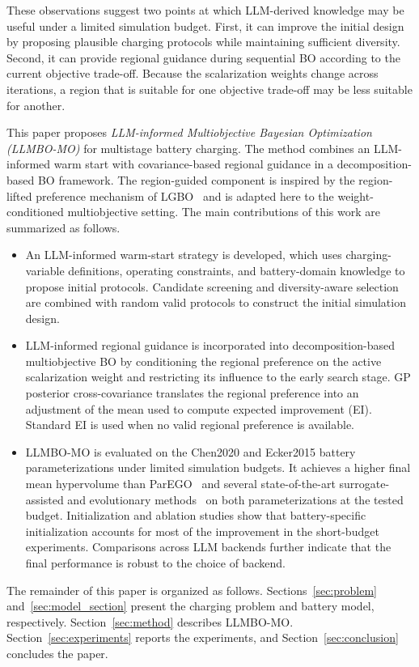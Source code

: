 These observations suggest two points at which LLM-derived knowledge may be
useful under a limited simulation budget. First, it can improve the initial
design by proposing plausible charging protocols while maintaining sufficient
diversity. Second, it can provide regional guidance during sequential BO
according to the current objective trade-off. Because the scalarization weights
change across iterations, a region that is suitable for one objective trade-off
may be less suitable for another.

This paper proposes \emph{LLM-informed Multiobjective Bayesian Optimization
(LLMBO-MO)} for multistage battery charging. The method combines an
LLM-informed warm start with covariance-based regional guidance in a
decomposition-based BO framework. The region-guided component is inspired by
the region-lifted preference mechanism of LGBO~\cite{ref5} and is adapted
here to the weight-conditioned multiobjective setting. The main contributions
of this work are summarized as follows.

\begin{itemize}

    \item An LLM-informed warm-start strategy is developed, which uses
    charging-variable definitions, operating constraints, and battery-domain
    knowledge to propose initial protocols. Candidate screening and
    diversity-aware selection are combined with random valid protocols to
    construct the initial simulation design.

    \item LLM-informed regional guidance is incorporated into
    decomposition-based multiobjective BO by conditioning the regional
    preference on the active scalarization weight and restricting its
    influence to the early search
    stage. GP posterior cross-covariance translates the regional preference
    into an adjustment of the mean used to compute expected improvement (EI).
    Standard EI is used when no valid regional preference is available.

    \item LLMBO-MO is evaluated on the Chen2020 and Ecker2015 battery
    parameterizations under limited simulation budgets. It achieves a higher
    final mean hypervolume than ParEGO~\cite{ref4} and several
    state-of-the-art surrogate-assisted and evolutionary
    methods~\cite{refDISK,refPIMD,refNSGAII} on both parameterizations at the
    tested budget. Initialization and ablation studies show that
    battery-specific initialization accounts for most of the improvement in
    the short-budget experiments. Comparisons across LLM backends further
    indicate that the final performance is robust to the choice of backend.

\end{itemize}

The remainder of this paper is organized as follows.
Sections~\ref{sec:problem} and~\ref{sec:model_section} present the charging
problem and battery model, respectively. Section~\ref{sec:method} describes
LLMBO-MO. Section~\ref{sec:experiments} reports the experiments, and
Section~\ref{sec:conclusion} concludes the paper.
